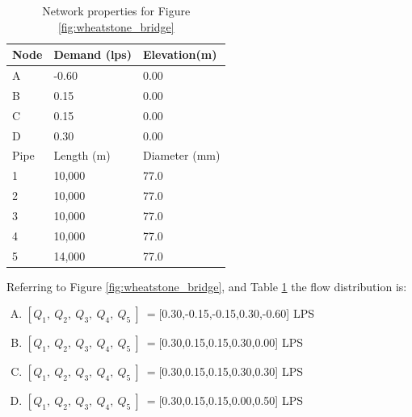 \documentclass[11pt]{article}
\begin{document}
\begin{enumerate}
\begin{table}[h!]
   \centering
   \caption{Network properties for Figure \ref{fig:wheatstone_bridge}}
\begin{tabular}{lll}
\hline
Node&Demand (lps)&  Elevation(m) \\
\hline
A & -0.60 & 0.00 \\
B &  0.15   & 0.00 \\
C & 0.15 & 0.00 \\
D & 0.30 & 0.00 \\
\hline
Pipe& Length (m)&  Diameter (mm)\\
\hline
1 & 10,000 & 77.0 \\
2 & 10,000 & 77.0 \\
3 & 10,000 & 77.0 \\
4 & 10,000 & 77.0 \\
5 & 14,000 & 77.0 \\
\end{tabular}
\label{tab:wheatstone1}
\normalsize
\end{table}



Referring to Figure \ref{fig:wheatstone_bridge}, and Table \ref{tab:wheatstone1} the flow distribution is:
\begin{enumerate}[(A)]
\item $[Q_1,~Q_2,~Q_3,~Q_4,~Q_5~]~=$[0.30,-0.15,-0.15,0.30,-0.60] LPS
\item $[Q_1,~Q_2,~Q_3,~Q_4,~Q_5~]~=$[0.30,0.15,0.15,0.30,0.00] LPS
\item $[Q_1,~Q_2,~Q_3,~Q_4,~Q_5~]~=$[0.30,0.15,0.15,0.30,0.30] LPS
\item $[Q_1,~Q_2,~Q_3,~Q_4,~Q_5~]~=$[0.30,0.15,0.15,0.00,0.50] LPS
\end{enumerate}
\end{enumerate}
\end{document}

